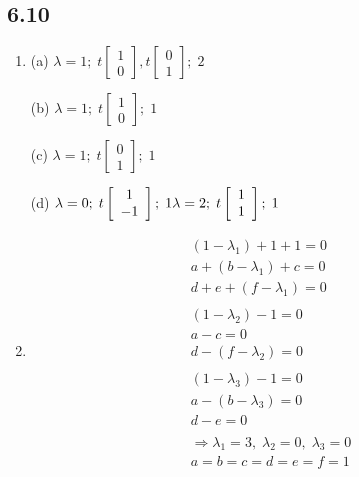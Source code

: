 \documentclass[a4paper, 12pt]{article}
\begin{document}
	\subsection*{6.10}
	\begin{enumerate}
		\item (a) $\lambda = 1 ;\;
		t\left[ \begin{array}{c}
			1 \\
			0
		\end{array} \right] ,
		t\left[ \begin{array}{c}
		0 \\
		1
		\end{array} \right] ;\;
		2$ \par
		(b) $\lambda = 1 ;\;
		t\left[ \begin{array}{c}
		1 \\
		0
		\end{array} \right] ;\;
		1$ \par
		(c) $\lambda = 1 ;\;
		t\left[ \begin{array}{c}
		0 \\
		1
		\end{array} \right] ;\;
		1$ \par
		(d) $\lambda = 0 ;\;
		t\left[ \begin{array}{c}
		1 \\
		-1
		\end{array} \right] ;\;
		1 \\
		\lambda = 2 ;\;
		t\left[ \begin{array}{c}
		1 \\
		1
		\end{array} \right] ;\;
		1$
		
		\setcounter{enumi}{5}
		\item \begin{gather*}
		(1 - \lambda_1) + 1 + 1 = 0 \\
		a + (b - \lambda_1) + c = 0 \\
		d + e + (f - \lambda_1) = 0 \\\\
		(1 - \lambda_2) - 1 = 0 \\
		a - c = 0 \\
		d - (f - \lambda_2) = 0 \\\\
		(1 - \lambda_3) - 1 = 0 \\
		a - (b - \lambda_3) = 0 \\
		d - e = 0 \\\\
		\Rightarrow \lambda_1 = 3,\; \lambda_2 = 0,\; \lambda_3 = 0 \\
		a = b = c = d = e = f = 1
		\end{gather*}
		

\end{enumerate}
\end{document}
